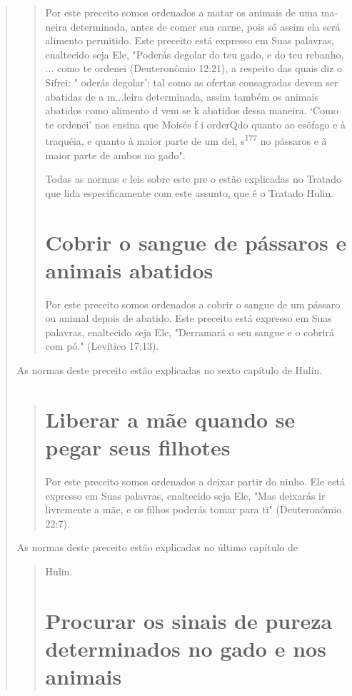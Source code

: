 \begin{quote}
\begin{quote}
Por este preceito somos ordenados a matar os animais de uma ma­neira
determinada, antes de comer sua carne, pois só assim ela será alimento
permitido. Este preceito está expresso em Suas palavras, enaltecido seja
Ele, "Poderás degolar do teu gado, e do teu rebanho, ... como te ordenei
(Deutero­nômio 12:21), a respeito das quais diz o Sifrei: " oderás
degolar': tal como as ofertas consagradas devem ser abatidas de a
m...leira determinada, assim também os animais
abatidos como alimento d vem se k abatidos dessa maneira. `Como te
ordenei' nos ensina que Moisés f i orderQdo quanto ao esôfago e à
traquéia, e quanto à maior parte de um del, s\textsuperscript{177} no
pássaros e à maior parte de ambos no gado".

Todas as normas e leis sobre este pre o estão explicadas no Trata­do que
lida especificamente com este assunto, que é o Tratado Hulin.

\section{Cobrir o sangue de pássaros e animais abatidos}

Por este preceito somos ordenados a cobrir o sangue de um pássaro ou
animal depois de abatido. Este preceito está expresso em Suas palavras,
enal­tecido seja Ele, "Derramará o seu sangue e o cobrirá com pó."
(Levítico 17:13).


\end{quote}

As normas deste preceito estão explicadas no sexto capítulo de Hulin.

\begin{quote}
\section{Liberar a mãe quando se pegar seus filhotes}

Por este preceito somos ordenados a deixar partir do ninho. Ele está
expresso em Suas palavras, enaltecido seja Ele, "Mas deixarás ir
livremente a mãe, e os filhos poderás tomar para ti" (Deuteronômio
22:7).
\end{quote}

As normas deste preceito estão explicadas no último capítulo de

\begin{quote}
Hulin.

\section{Procurar os sinais de pureza determinados no gado e nos animais}


\end{quote}
\end{quote}
